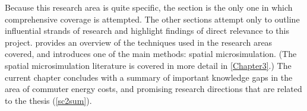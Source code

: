 Because this
research area is quite specific, the section is the only one in which
comprehensive coverage is attempted. The other sections attempt
only to outline influential strands of research and highlight findings
of direct relevance to this project.  provides
an overview of the techniques used in the research areas covered, and introduces
one of the main methods: spatial microsimulation.
(The spatial microsimulation literature is covered in more detail in
\cref{Chapter3}.)
The current chapter
concludes with a summary of important knowledge gaps in the area of
commuter energy costs, and promising research directions that
are related to the thesis (\cref{sc2sum}).

